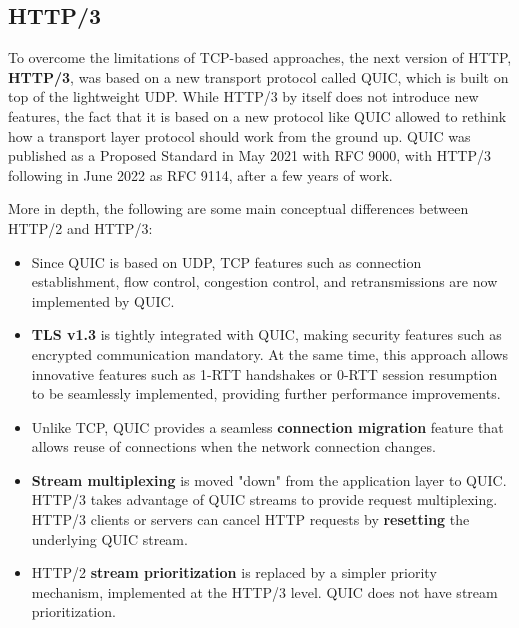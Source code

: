 \subsection{HTTP/3}
\label{sec:bg/http3}

To overcome the limitations of TCP-based approaches, the next version of HTTP, \textbf{HTTP/3}, was based on a new transport protocol called QUIC, which is built on top of the lightweight UDP. While HTTP/3 by itself does not introduce new features, the fact that it is based on a new protocol like QUIC allowed to rethink how a transport layer protocol should work from the ground up. QUIC was published as a Proposed Standard in May 2021 with RFC 9000, with HTTP/3 following in June 2022 as RFC 9114, after a few years of work.\cite{http3}

More in depth, the following are some main conceptual differences between HTTP/2 and HTTP/3:

\begin{itemize}
    \item Since QUIC is based on UDP, TCP features such as connection establishment, flow control, congestion control, and retransmissions are now implemented by QUIC.
    \item \textbf{TLS v1.3} is tightly integrated with QUIC, making security features such as encrypted communication mandatory. At the same time, this approach allows innovative features such as 1-RTT handshakes or 0-RTT session resumption to be seamlessly implemented, providing further performance improvements.
    \item Unlike TCP, QUIC provides a seamless \textbf{connection migration} feature that allows reuse of connections when the network connection changes.
    \item \textbf{Stream multiplexing} is moved "down" from the application layer to QUIC. HTTP/3 takes advantage of QUIC streams to provide request multiplexing. HTTP/3 clients or servers can cancel HTTP requests by \textbf{resetting} the underlying QUIC stream.
    \item HTTP/2 \textbf{stream prioritization} is replaced by a simpler priority mechanism, implemented at the HTTP/3 level. QUIC does not have stream prioritization.
\end{itemize}

